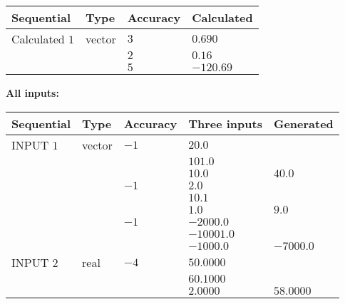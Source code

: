 \documentclass[12pt]{article}
\begin{document}
   
   
   
\noindent{}
   
   
  
  
\noindent\begin{tabular}{|l|l|l|l|}
\hline
 Sequential & Type & Accuracy & Calculated \\ 
\hline
 
 
  Calculated $            1 $ & vector &  
  $            3  $ 
 &  $ 0.690 $ 
 \\    
  & & 
  $            2  $ 
 &  $ 0.16 $ 
 \\    
  & & 
  $            5  $ 
 &  $ -120.69 $ 
 \\  \hline  
 \end{tabular}
   
   
   
   
\noindent\vspace{0.1in}\hspace{-0.08in} {\textbf{\Large{All inputs: }}}
   
   
  
  
\noindent\begin{tabular}{|l|l|l|l|l|}
\hline
 Sequential & Type & Accuracy & Three inputs & Generated \\ 
\hline
 
 
  INPUT $            1 $ & vector & $           -1  $ & $
20.0
  $ & \\
  & & & $
101.0
  $ & \\
  & & & $
10.0
$ & $ 40.0 $ 
  \\
  & & $           -1  $ & $
2.0
  $ & \\
  & & & $
10.1
  $ & \\
  & & & $
1.0
$ & $ 9.0 $ 
  \\
  & & $           -1  $ & $
-2000.0
  $ & \\
  & & & $
-10001.0
  $ & \\
  & & & $
-1000.0
$ & $ -7000.0 $ 
 \\  \hline  
 
 
  INPUT $            2 $ & real & $           -4  $ & $
 50.0000
  $ & \\
  & & &  $
 60.1000
  $ & \\
  & & &  $
 2.0000
 $ & $ 58.0000 $ 
 \\  \hline  
 \end{tabular}
   
   
  
\vspace{0.2in}
  
\end{document}
